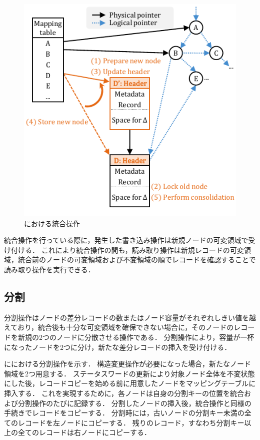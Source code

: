 \begin{figure}[t]
    \centering
    \includegraphics{./figures/Bc-consolidate.pdf}
    \caption{\Bcforest{}における統合操作}
    \label{fig:bc_tree_consolidastion}
\end{figure}

統合操作を行っている際に，発生した書き込み操作は新規ノードの可変領域で受け付ける．
これにより統合操作の間も，読み取り操作は新規レコードの可変領域，統合前のノードの可変領域および不変領域の順でレコードを確認することで読み取り操作を実行できる．

\subsection{分割}
分割操作はノードの差分レコードの数またはノード容量がそれぞれしきい値を越えており，統合後も十分な可変領域を確保できない場合に，そのノードのレコードを新規の2つのノードに分散させる操作である．
分割操作により，容量が一杯になったノードを2つに分け，新たな差分レコードの挿入を受け付ける．

\Fig{\ref{fig:bc_tree_split}}に\Bcforest{}における分割操作を示す．
構造変更操作が必要になった場合，新たなノード領域を2つ用意する．
ステータスワードの更新により対象ノード全体を不変状態にした後，レコードコピーを始める前に用意したノードをマッピングテーブルに挿入する．
これを実現するために，各ノードは自身の分割キーの位置を統合および分割操作のたびに記録する．
分割したノードの挿入後，統合操作と同様の手続きでレコードをコピーする．
分割時には，古いノードの分割キー未満の全てのレコードを左ノードにコピーする．
残りのレコード，すなわち分割キー以上の全てのレコードは右ノードにコピーする．

